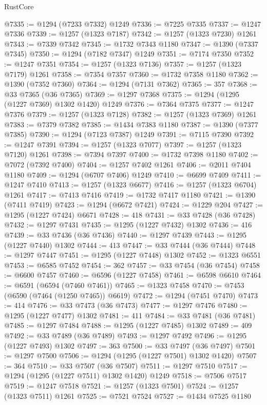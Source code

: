 \begin{lexlean}{RustCore}
\begin{coremodule}
@7335 := @1294 (@7233 @7332) @1249
@7336 := @7225 @7335
@7337 := @1247 @7336
@7339 := @1257 (@1323 @7187)
@7342 := @1257 (@1323 @7230) @1261
@7343 := @7339 @7342
@7345 := @1732 @7343 @1180
@7347 := @1390 (@7337 @7345)
@7350 := @1294 (@7182 @7347) @1249
@7351 := @7174 @7350
@7352 := @1247 @7351
@7354 := @1257 (@1323 @7136)
@7357 := @1257 (@1323 @7179) @1261
@7358 := @7354 @7357
@7360 := @1732 @7358 @1180
@7362 := @1390 (@7352 @7360)
@7364 := @1294 (@7131 @7362)
@7365 := 357
@7368 := @33 @7365 (@36 @7365)
@7369 := @1297 @7368
@7375 := @1294 (@1295 (@1227 @7369) @1302 @1420) @1249
@7376 := @7364 @7375
@7377 := @1247 @7376
@7379 := @1257 (@1323 @7128)
@7382 := @1257 (@1323 @7369) @1261
@7383 := @7379 @7382
@7385 := @1434 @7383 @1180
@7387 := @1390 (@7377 @7385)
@7390 := @1294 (@7123 @7387) @1249
@7391 := @7115 @7390
@7392 := @1247 @7391
@7394 := @1257 (@1323 @7077)
@7397 := @1257 (@1323 @7120) @1261
@7398 := @7394 @7397
@7400 := @1732 @7398 @1180
@7402 := @7072 (@7392 @7400)
@7404 := @1257 @7402 @1261
@7406 := @2011 @7404 @1180
@7409 := @1294 (@6707 @7406) @1249
@7410 := @6699 @7409
@7411 := @1247 @7410
@7413 := @1257 (@1323 @6677)
@7416 := @1257 (@1323 @6704) @1261
@7417 := @7413 @7416
@7419 := @1732 @7417 @1180
@7421 := @1390 (@7411 @7419)
@7423 := @1294 (@6672 @7421)
@7424 := @1229 @204
@7427 := @1295 (@1227 @7424) @6671
@7428 := 418
@7431 := @33 @7428 (@36 @7428)
@7432 := @1297 @7431
@7435 := @1295 (@1227 @7432) @1302
@7436 := 416
@7439 := @33 @7436 (@36 @7436)
@7440 := @1297 @7439
@7443 := @1295 (@1227 @7440) @1302
@7444 := 413
@7447 := @33 @7444 (@36 @7444)
@7448 := @1297 @7447
@7451 := @1295 (@1227 @7448) @1302
@7452 := @1323 @6551
@7453 := @6585 @7452
@7454 := 362
@7457 := @33 @7454 (@36 @7454)
@7458 := @6600 @7457
@7460 := @6596 (@1227 @7458)
@7461 := @6598 @6610
@7464 := @6591 (@6594 (@7460 @7461))
@7465 := @1323 @7458
@7470 := @7453 (@6590 (@7464 (@1250 @7465)) @6619)
@7472 := @1294 (@7451 @7470)
@7473 := 414
@7476 := @33 @7473 (@36 @7473)
@7477 := @1297 @7476
@7480 := @1295 (@1227 @7477) @1302
@7481 := 411
@7484 := @33 @7481 (@36 @7481)
@7485 := @1297 @7484
@7488 := @1295 (@1227 @7485) @1302
@7489 := 409
@7492 := @33 @7489 (@36 @7489)
@7493 := @1297 @7492
@7496 := @1295 (@1227 @7493) @1302
@7497 := 363
@7500 := @33 @7497 (@36 @7497)
@7501 := @1297 @7500
@7506 := @1294 (@1295 (@1227 @7501) @1302 @1420)
@7507 := 364
@7510 := @33 @7507 (@36 @7507)
@7511 := @1297 @7510
@7517 := @1294 (@1295 (@1227 @7511) @1302 @1420) @1249
@7518 := @7506 @7517
@7519 := @1247 @7518
@7521 := @1257 (@1323 @7501)
@7524 := @1257 (@1323 @7511) @1261
@7525 := @7521 @7524
@7527 := @1434 @7525 @1180

\end{coremodule}
\end{lexlean}

